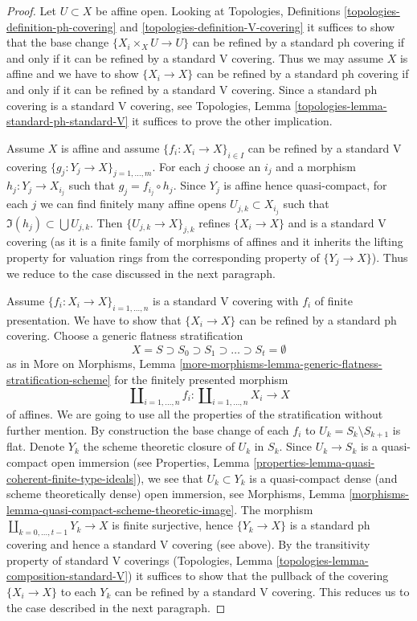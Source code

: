 \begin{proof}

Let $U \subset X$ be affine open. Looking at
Topologies, Definitions \ref{topologies-definition-ph-covering}
and \ref{topologies-definition-V-covering} it suffices to show that
the base change $\{X_i \times_X U \to U\}$ can be refined
by a standard ph covering if and only if it can be refined by
a standard V covering. Thus we may assume $X$ is affine and we have to show
$\{X_i \to X\}$ can be refined by a standard ph covering
if and only if it can be refined by a standard V covering.
Since a standard ph covering is a standard V covering, see
Topologies, Lemma \ref{topologies-lemma-standard-ph-standard-V}
it suffices to prove the other implication.

\medskip\noindent
Assume $X$ is affine and assume $\{f_i : X_i \to X\}_{i \in I}$
can be refined by a standard V covering
$\{g_j : Y_j \to X\}_{j = 1, \ldots, m}$.
For each $j$ choose an $i_j$ and a morphism
$h_j : Y_j \to X_{i_j}$ such that $g_j = f_{i_j} \circ h_j$.
Since $Y_j$ is affine hence quasi-compact,
for each $j$ we can find finitely many affine opens
$U_{j, k} \subset X_{i_j}$ such that $\Im(h_j) \subset \bigcup U_{j, k}$.
Then $\{U_{j, k} \to X\}_{j, k}$ refines $\{X_i \to X\}$
and is a standard V covering (as it is a finite family of morphisms
of affines and it inherits the lifting property for valuation rings
from the corresponding property of $\{Y_j \to X\}$).
Thus we reduce to the case discussed in the next paragraph.

\medskip\noindent
Assume $\{f_i : X_i \to X\}_{i = 1, \ldots, n}$
is a standard V covering with $f_i$ of finite presentation.
We have to show that $\{X_i \to X\}$ can be refined by a standard ph covering.
Choose a generic flatness stratification
$$
X = S \supset S_0 \supset S_1 \supset \ldots \supset S_t = \emptyset
$$
as in More on Morphisms, Lemma
\ref{more-morphisms-lemma-generic-flatness-stratification-scheme}
for the finitely presented morphism
$$
\coprod\nolimits_{i = 1, \ldots, n} f_i :
\coprod\nolimits_{i = 1, \ldots, n} X_i
\longrightarrow
X
$$
of affines. We are going to use all the properties of the stratification
without further mention. By construction the base change of each $f_i$ to
$U_k = S_k \setminus S_{k + 1}$ is flat.
Denote $Y_k$ the scheme theoretic closure of $U_k$ in $S_k$. Since
$U_k \to S_k$ is a quasi-compact open immersion (see
Properties, Lemma \ref{properties-lemma-quasi-coherent-finite-type-ideals}),
we see that $U_k \subset Y_k$ is a quasi-compact dense
(and scheme theoretically dense) open immersion, see
Morphisms, Lemma \ref{morphisms-lemma-quasi-compact-scheme-theoretic-image}.
The morphism $\coprod_{k = 0, \ldots, t - 1} Y_k \to X$
is finite surjective, hence $\{Y_k \to X\}$ is a standard ph covering
and hence a standard V covering (see above). By the transitivity
property of standard V coverings
(Topologies, Lemma \ref{topologies-lemma-composition-standard-V})
it suffices to show that the pullback of
the covering $\{X_i \to X\}$ to each $Y_k$ can be refined by a
standard V covering. This reduces us to the case described in the
next paragraph.


\end{proof}
